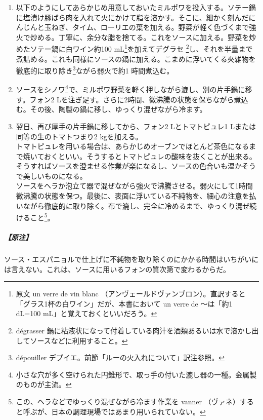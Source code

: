 \begin{recette}
\begin{enumerate}
  弱火にして\footnote{原文から直訳すると「鍋を火の脇に置く」だが、現代の調理環境では単純に「弱火にする」と解釈していい。}微沸騰の状態を保つ。
\item
  以下のようにしてあらかじめ用意しておいたミルポワを投入する。ソテー鍋に塩漬け豚ばら肉を入れて火にかけて脂を溶かす。そこに、細かく刻んだにんじんと玉ねぎ、タイム、ローリエの葉を加える。野菜が軽く色づくまで強火で炒める。丁寧に、余分な脂を捨てる。これをソースに加える。野菜を炒めたソテー鍋に白ワイン約100
  mL\footnote{原文 un verre de vin blanc
    （アンヴェールドヴァンブロン）。直訳すると「グラス1杯の白ワイン」だが、本書において
    un verre de 〜は「約1 dL=100 mL」と覚えておくといいだろう。}を加えてデグラセ
  \footnote{dégrasser
    鍋に粘液状になって付着している肉汁を酒類あるいは水で溶かし出してソースなどに利用すること。}し、それを半量まで煮詰める。これも同様にソースの鍋に加える。こまめに浮いてくる夾雑物を徹底的に取り除き\footnote{dépouiller
    デプイエ。前節「ルーの火入れについて」訳注参照。}ながら弱火で約1
  時間煮込む。
\item
  ソースをシノワ\footnote{小さな穴が多く空けられた円錐形で、取っ手の付いた漉し器の一種。金属製のものが主流。}で、ミルポワ野菜を軽く押しながら漉し、別の片手鍋に移す。フォン2
  Lを注ぎ足す。さらに2時間、微沸騰の状態を保ちながら煮込む。その後、陶製の鍋に移し、ゆっくり混ぜながら冷ます。
\item
  翌日、再び厚手の片手鍋に移してから、フォン2 Lとトマトピュレ1
  Lまたは同等の生のトマトつまり2 kgを加える。\\
  トマトピュレを用いる場合は、あらかじめオーブンでほとんど茶色になるまで焼いておくといい。そうするとトマトピュレの酸味を抜くことが出来る。\\
  そうすればソースを澄ませる作業が楽になるし、ソースの色合いも温かそうで美しいものになる。\\
  ソースをヘラか泡立て器で混ぜながら強火で沸騰させる。弱火にして1時間微沸騰の状態を保つ。最後に、表面に浮いている不純物を、細心の注意を払いながら徹底的に取り除く。布で漉し、完全に冷めるまで、ゆっくり混ぜ続けること\footnote{この、ヘラなどでゆっくり混ぜながら冷ます作業を
    vanner
    （ヴァネ）すると呼ぶが、日本の調理現場ではあまり用いられていない。}。
\end{enumerate}

\hypertarget{nota-sauce-espagnole}{%
\subparagraph{【原注】}\label{nota-sauce-espagnole}}

ソース・エスパニョルで仕上げに不純物を取り除くのにかかる時間はいちがいには言えない。これは、ソースに用いるフォンの質次第で変わるからだ。


\end{recette}
